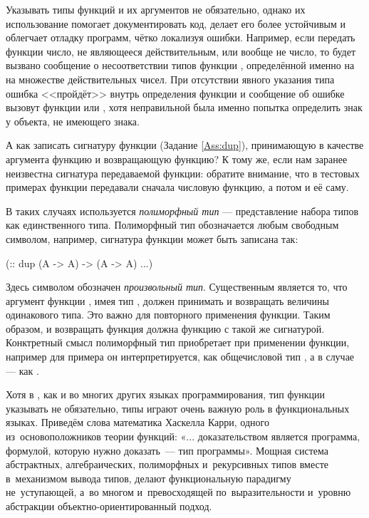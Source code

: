 Указывать типы функций и их аргументов не обязательно, однако их использование помогает документировать код, делает его более устойчивым и облегчает отладку программ, чётко локализуя ошибки. Например, если передать функции  число, не являющееся действительным, или вообще не число, то будет вызвано сообщение о несоответствии типов функции , определённой именно на на множестве действительных чисел. При отсутствии явного указания типа ошибка <<пройдёт>> внутрь определения функции и сообщение об ошибке вызовут функции  или , хотя неправильной была именно попытка определить знак у объекта, не имеющего знака.

А как записать сигнатуру функции  (Задание \ref{Ass:dup}), принимающую в качестве аргумента функцию и возвращающую функцию? К тому же, если нам заранее неизвестна сигнатура передаваемой функции: обратите внимание, что в тестовых примерах функции  передавали сначала числовую функцию, а потом и её саму. 

В таких случаях используется  \emph{полиморфный тип} --- представление набора типов как единственного типа. Полиморфный тип обозначается любым свободным символом, например, сигнатура функции  может быть записана так:

\begin{SchemeCode}
 (:: dup (A -> A) -> (A -> A)
   ...)
\end{SchemeCode}

Здесь символом  обозначен \emph{произвольный тип}. Существенным является то, что аргумент функции , имея тип , должен принимать и возвращать величины одинакового типа. Это важно для повторного применения функции. Таким образом, и возвращать функция  должна функцию с такой же сигнатурой. Конктретный смысл полиморфный тип  приобретает при применении функции, например для примера  он интерпретируется, как общечисловой тип , а в случае  --- как .

Хотя в , как и во многих других языках программирования, тип функции указывать не обязательно, типы играют очень важную роль в функциональных языках. Приведём слова математика Хаскелла Карри, одного из~основоположников теории функций: «... доказательством является программа, формулой, которую нужно доказать~--- тип программы». Мощная система абстрактных, алгебраических, полиморфных и~рекурсивных типов вместе в~механизмом вывода типов, делают функциональную парадигму не~уступающей, а~во многом и~превосходящей по~выразительности и~уровню абстракции объектно-ориентированный подход.

